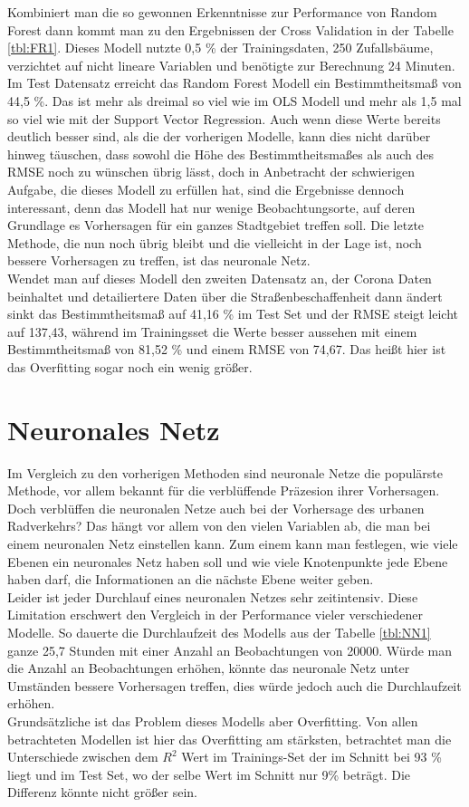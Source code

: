 \documentclass[a4paper,12pt]{thesis}
\begin{document}
Kombiniert man die so gewonnen Erkenntnisse zur Performance von Random Forest dann kommt man zu den Ergebnissen der Cross Validation in der Tabelle \ref{tbl:FR1}. Dieses Modell nutzte 0,5 \% der Trainingsdaten, 250 Zufallsbäume, verzichtet auf nicht lineare Variablen und benötigte zur Berechnung 24 Minuten. Im Test Datensatz erreicht das Random Forest Modell ein Bestimmtheitsmaß von 44,5 \%. Das ist mehr als dreimal so viel wie im OLS Modell und mehr als 1,5 mal so viel wie mit der Support Vector Regression. Auch wenn diese Werte bereits deutlich besser sind, als die der vorherigen Modelle, kann dies nicht darüber hinweg täuschen, dass sowohl die Höhe des Bestimmtheitsmaßes als auch des RMSE noch zu wünschen übrig lässt, doch in Anbetracht der schwierigen Aufgabe, die dieses Modell zu erfüllen hat, sind die Ergebnisse dennoch interessant, denn das Modell hat nur wenige Beobachtungsorte, auf deren Grundlage es Vorhersagen für ein ganzes Stadtgebiet treffen soll. Die letzte Methode, die nun noch übrig bleibt und die vielleicht in der Lage ist, noch bessere Vorhersagen zu treffen, ist das neuronale Netz.\\

Wendet man auf dieses Modell den zweiten Datensatz an, der Corona Daten beinhaltet und detailiertere Daten über die Straßenbeschaffenheit dann ändert sinkt das Bestimmtheitsmaß auf 41,16 \% im Test Set und der RMSE steigt leicht auf 137,43, während im Trainingsset die Werte besser aussehen mit einem Bestimmtheitsmaß von 81,52 \% und einem RMSE von 74,67. Das heißt hier ist das Overfitting sogar noch ein wenig größer. 

\section{Neuronales Netz}

Im Vergleich zu den vorherigen Methoden sind neuronale Netze die populärste Methode, vor allem bekannt für die verblüffende Präzesion ihrer Vorhersagen. Doch verblüffen die neuronalen Netze auch bei der Vorhersage des urbanen Radverkehrs? Das hängt vor allem von den vielen Variablen ab, die man bei einem neuronalen Netz einstellen kann. Zum einem kann man festlegen, wie viele Ebenen ein neuronales Netz haben soll und wie viele Knotenpunkte jede Ebene haben darf, die Informationen an die nächste Ebene weiter geben.\\
Leider ist jeder Durchlauf eines neuronalen Netzes sehr zeitintensiv. Diese Limitation erschwert den Vergleich in der Performance vieler verschiedener Modelle. So dauerte die Durchlaufzeit des Modells aus der Tabelle \ref{tbl:NN1} ganze 25,7 Stunden mit einer Anzahl an Beobachtungen von 20000. Würde man die Anzahl an Beobachtungen erhöhen, könnte das neuronale Netz unter Umständen bessere Vorhersagen treffen, dies würde jedoch auch die Durchlaufzeit erhöhen.\\
Grundsätzliche ist das Problem dieses Modells aber Overfitting. Von allen betrachteten Modellen ist hier das Overfitting am stärksten, betrachtet man die Unterschiede zwischen dem $R^2$ Wert im Trainings-Set der im Schnitt bei 93 \% liegt und im Test Set, wo der selbe Wert im Schnitt nur 9\% beträgt. Die Differenz könnte nicht größer sein.
\end{document}

